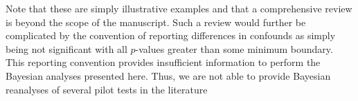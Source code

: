 \documentclass[man]{apa6}
\begin{document}
Note that these are simply illustrative examples and that a comprehensive review is beyond the scope of the manuscript. Such a review would further be complicated by the convention of reporting differences in confounds as simply being not significant with all $p$-values greater than some minimum boundary. %
This reporting convention provides insufficient information to perform the Bayesian analyses presented here. Thus, we are not able to provide Bayesian reanalyses of several pilot tests in the literature \citep{Anderson:Dill:2000, Engelhardt:etal:2011, Konijn:etal:2007}
\end{document}
